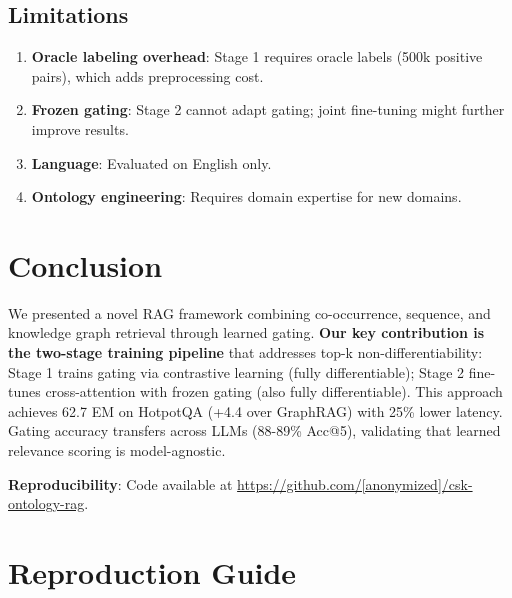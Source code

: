 \documentclass[10pt,twocolumn]{article}
\begin{document}
\subsection{Limitations}

\begin{enumerate}
    \item \textbf{Oracle labeling overhead}: Stage 1 requires oracle labels (500k positive pairs), which adds preprocessing cost.
    \item \textbf{Frozen gating}: Stage 2 cannot adapt gating; joint fine-tuning might further improve results.
    \item \textbf{Language}: Evaluated on English only.
    \item \textbf{Ontology engineering}: Requires domain expertise for new domains.
\end{enumerate}


\section{Conclusion}

We presented a novel RAG framework combining co-occurrence, sequence, and knowledge graph retrieval through learned gating. \textbf{Our key contribution is the two-stage training pipeline} that addresses top-k non-differentiability: Stage 1 trains gating via contrastive learning (fully differentiable); Stage 2 fine-tunes cross-attention with frozen gating (also fully differentiable). This approach achieves 62.7 EM on HotpotQA (+4.4 over GraphRAG) with 25\% lower latency. Gating accuracy transfers across LLMs (88-89\% Acc@5), validating that learned relevance scoring is model-agnostic.

\textbf{Reproducibility}: Code available at \url{https://github.com/[anonymized]/csk-ontology-rag}.




\appendix

\section{Reproduction Guide}
\label{app:repro}
\end{document}
